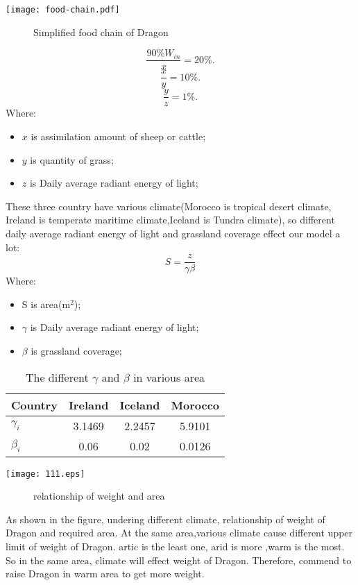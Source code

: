 \documentclass[12pt]{article}
\begin{document}
\centerline{\texttt{[image: food-chain.pdf]}} %
\begin{figure}[!htbp]
    \small
    \caption{Simplified food chain of Dragon}\label{jj}
\end{figure}
\begin{equation}
	\frac{90\%W_{in}}{x}=20\% .	%
\end{equation}
\begin{equation}
	\frac{x}{y}=10\% .	%
\end{equation}
\begin{equation}
	\frac{y}{z}=1\% .	%
\end{equation}
Where:
\begin{itemize}
	 \item $x$ is assimilation amount of sheep or cattle;
	 \item $y$ is quantity of grass;
	 \item $z$ is Daily average radiant energy of light;
\end{itemize}
These three country have various climate(Morocco is tropical desert climate, Ireland is temperate maritime climate,Iceland is Tundra climate), so different daily average radiant energy of light and grassland coverage effect our model a lot:
\begin{equation}
	S=\frac{z}{\gamma\beta}	%
\end{equation}
Where:
\begin{itemize}
	 \item S is area(m$^2$);
	 \item $\gamma$ is Daily average radiant energy of light;
	 \item $\beta$ is grassland coverage;
\end{itemize}
\begin{table}[!htbp]
\begin{center}
\caption{The different $\gamma$ and $\beta$ in various area}
\begin{tabular}{lccc}
    \toprule
    Country& Ireland& Iceland& Morocco\\
    \midrule
    $\gamma_i$& 3.1469& 2.2457& 5.9101\\
    $\beta_i$& 0.06& 0.02& 0.0126\\
    \bottomrule
\end{tabular}\label{h}
\end{center}
\end{table}
\centerline{\texttt{[image: 111.eps]}}
\begin{figure}[!htbp]
    \small
    \caption{relationship of weight and area}\label{jj}
\end{figure}
As shown in the figure, undering different climate, relationship of weight of Dragon and required area. At the same area,various climate cause different upper limit of weight of Dragon. artic is the least one, arid is more ,warm is the most. So in the same area, climate will effect weight of Dragon. Therefore, commend to raise Dragon in warm area to get more weight. \\
\end{document}
